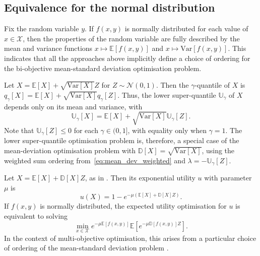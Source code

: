 \documentclass[main.tex]{subfiles}
\begin{document}
\subsection{Equivalence for the normal distribution}
Fix the random variable $y$. If $f(x,y)$ is normally distributed for each value of
$x\in\mathcal{X}$, then the properties of the random variable are fully
described by the mean and variance functions $x\mapsto
\mathbb{E}[f(x,y)]$ and $x\mapsto \mbox{Var}[f(x,y)]$. This
indicates that all the approaches above implicitly define a
choice of ordering for the bi-objective mean-standard deviation
optimisation problem.

\begin{example}\label{ex:avar_normal}
  Let $X=\mathbb{E}[X]+ \sqrt{\mbox{Var}[X]} Z$ for $Z\sim\mathcal{N}(0,1)$.
  Then the $\gamma$-quantile of $X$ is
  $q_\gamma[X] = \mathbb{E}[X] + \sqrt{\mbox{Var}[X]} q_\gamma[Z]$.
  Thus, the lower super-quantile $\mathbb{U}_\gamma$ of $X$ depends only on
  its mean and variance, with
  \begin{equation}
    \mathbb{U}_\gamma[X] =  \mathbb{E}[X]
    + \sqrt{\mbox{Var}[X]} \mathbb{U}_\gamma[Z].
  \end{equation}
  Note that $\mathbb{U}_\gamma[Z]\leq 0$ for each $\gamma\in(0,1]$,
  with equality only when $\gamma=1$.
  The lower super-quantile optimisation problem is, therefore,
  a special case of the mean-deviation optimisation problem
  with $\mathbb{D}[X]=\sqrt{\mbox{Var}[X]}$,
  using the weighted sum ordering from~\eqref{eq:mean_dev_weighted} and
  $\lambda = -\mathbb{U}_\gamma[Z]$.
\end{example}

\begin{example}
  Let $X=\mathbb{E}[X]+ \mathbb{D}[X] Z$, as in .
  Then its exponential utility $u$ with parameter $\mu$
  is
  \begin{equation}
    u(X) = 1 - e^{-\mu (\mathbb{E}[X] +
      \mathbb{D}[X] Z)}.
  \end{equation}
  If $f(x,y)$ is normally distributed, the expected utility
  optimisation for $u$ is equivalent to solving
  \begin{equation}
    \min_{x\in\mathcal{X}}  e^{-\mu\mathbb{E}[f(x,y)]}
    \mathbb{E} \left[ e^{-\mu \mathbb{D}[f(x,y)] Z} \right].
  \end{equation}
  In the context of multi-objective optimisation, this arises from
  a particular choice of ordering of the mean-standard deviation
  problem \citep{marler2004survey}.
\end{example}
\end{document}

